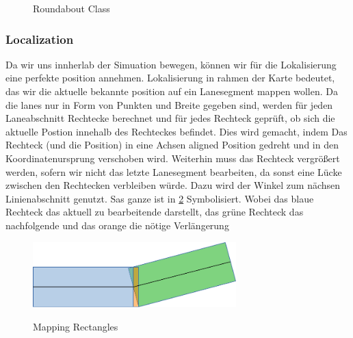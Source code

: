 \documentclass[11pt,oneside,openright]{mpreport}
\begin{document}
\begin{figure}[!ht]
\begin{center}
\caption{Roundabout Class}
\label{roundabout_class}
\end{center}
\end{figure}


\subsubsection{Localization}
Da wir uns innherlab der Simuation bewegen, können wir für die Lokalisierung eine perfekte position annehmen.
Lokalisierung in rahmen der Karte bedeutet, das wir die aktuelle bekannte position auf ein Lanesegment mappen wollen.
Da die lanes nur in Form von Punkten und Breite gegeben sind, werden für jeden Laneabschnitt Rechtecke berechnet und für jedes Rechteck geprüft,
ob sich die aktuelle Postion innehalb des Rechteckes befindet. Dies wird gemacht, indem Das Rechteck (und die Position) in eine
Achsen aligned Position gedreht und in den Koordinatenursprung verschoben wird. Weiterhin muss das Rechteck vergrößert werden, sofern wir nicht das letzte Lanesegment bearbeiten,
da sonst eine Lücke zwischen den Rechtecken verbleiben würde. Dazu wird der Winkel zum nächsen Linienabschnitt genutzt.  Sas ganze ist in \cref{mapping} Symbolisiert.
Wobei das blaue Rechteck das aktuell zu bearbeitende darstellt, das grüne Rechteck das nachfolgende und das orange die nötige Verlängerung
\begin{figure}[!ht]
\begin{center}
\caption{Mapping Rectangles}
\includegraphics[width=0.7\textwidth]{bilder/mapping.pdf}
\label{mapping}
\end{center}
\end{figure}
\end{document}
